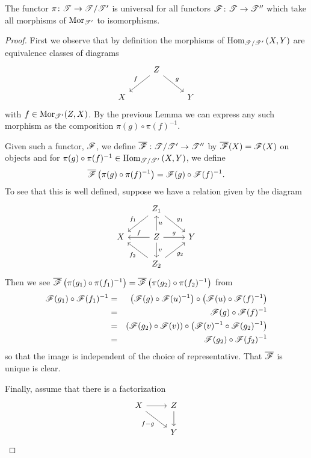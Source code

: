 \documentclass[dissertation.tex]{subfiles}
\begin{document}
\begin{prop}
  The functor $\pi \colon \mathscr{T} \to \mathscr{T}/\mathscr{T}^\prime$ is universal for all functors $\mathscr{F} \colon \mathscr{T} \rightarrow \mathscr{T}^{\prime\prime}$ which take all morphisms of $\operatorname{Mor}_{\mathscr{T}^\prime}$ to isomorphisms.
  
  \begin{proof}
    First we observe that by definition the morphisms of $\operatorname{Hom}_{\mathscr{T}/\mathscr{T}^\prime}\left(X,Y\right)$ are equivalence classes of diagrams
    $$\begin{tikzcd}
      & Z \arrow[swap]{ld}{f} \arrow{rd}{g}\\
      X & & Y
    \end{tikzcd}$$
    with $f \in \operatorname{Mor}_{\mathscr{T}^\prime}(Z,X)$.
    By the previous Lemma we can express any such morphism as the composition
    $\pi(g) \circ \pi(f)^{-1}$.
    
    Given such a functor, $\mathscr{F}$, we define $\overline{\mathscr{F}}: \mathscr{T}/\mathscr{T}^\prime \rightarrow \mathscr{T}^{\prime\prime}$ by $\overline{\mathscr{F}}(X) = \mathscr{F}(X)$ on objects and for $\pi(g) \circ \pi(f)^{-1} \in \operatorname{Hom}_{\mathscr{T}/\mathscr{T}^\prime}\left(X,Y\right)$, we define
    $$\overline{\mathscr{F}}\left(\pi(g) \circ \pi(f)^{-1}\right) = \mathscr{F}(g) \circ \mathscr{F}(f)^{-1}.$$
    To see that this is well defined, suppose we have a relation given by the diagram
    $$\begin{tikzcd}
      & Z_1 \arrow[swap]{ld}{f_1}\arrow{rd}{g_1}\\
      X & Z \arrow[swap]{l}{f} \arrow[swap]{u}{u} \arrow{d}{v} \arrow{r}{g} & Y\\
      & Z_2 \arrow{ul}{f_2} \arrow[swap]{ur}{g_2}
    \end{tikzcd}$$
    Then we see $\overline{\mathscr{F}}\left(\pi(g_1) \circ \pi(f_1)^{-1}\right) = \overline{\mathscr{F}}\left(\pi(g_2)\circ\pi(f_2)^{-1}\right)$ from
    \begin{eqnarray*}
      \mathscr{F}(g_1)\circ\mathscr{F}(f_1)^{-1} 
      &=& \left(\mathscr{F}(g)\circ\mathscr{F}(u)^{-1}\right)\circ\left(\mathscr{F}(u)\circ\mathscr{F}(f)^{-1}\right)\\
      &=& \mathscr{F}(g)\circ\mathscr{F}(f)^{-1}\\
      &=& \left(\mathscr{F}(g_2)\circ\mathscr{F}(v)\right)\circ\left(\mathscr{F}(v)^{-1}\circ\mathscr{F}(g_2)^{-1}\right)\\
      &=& \mathscr{F}(g_2) \circ \mathscr{F}(f_2)^{-1}
    \end{eqnarray*}
    so that the image is independent of the choice of representative.
    That $\overline{\mathscr{F}}$ is unique is clear.

    Finally, assume that there is a factorization
    $$\begin{tikzcd}
      X \arrow{r}\arrow[swap]{rd}{f - g} & Z\arrow{d}\\
      & Y
    \end{tikzcd}$$
  \end{proof}
\end{prop}
\end{document}
